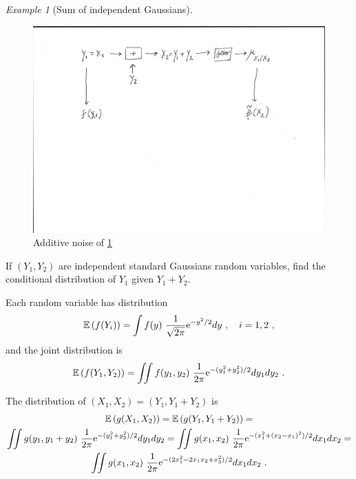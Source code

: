 \documentclass[12pt,a4paper]{amsart}
\theoremstyle{plain}%
\theoremstyle{definition}
\theoremstyle{remark}
\newtheorem{example}{Example}
\begin{document}
\begin{example}[Sum of independent Gaussians]\label{ex:filter}
\begin{figure}
  \centering
  \includegraphics[height=.2\textheight]{pictures/filter.pdf}
  \caption{Additive noise of \cref{ex:filter}\label{fig:filter}}
\end{figure}
If $(Y_1,Y_2)$ are independent standard Gaussians random variables,
find the conditional distribution of $Y_1$ given $Y_1+Y_2$.

Each random variable has distribution
\begin{equation*}
  \expectof{f(Y_i)} = \int f(y) \ \frac1{\sqrt{2\pi}}
  \euler^{-y^2/2}dy \ , \quad i=1,2 \ ,
\end{equation*}
and the joint distribution is
\begin{equation*}
  \operatorname{\mathbb E}\left(f(Y_1,Y_2)\right) = \iint f(y_1,y_2) \ \frac1{2\pi} 
  \mathrm{e}^{-(y_1^2+y_2^2)/2}dy_1dy_2 \ .
\end{equation*}

The distribution of $(X_1,X_2) = (Y_1,Y_1+Y_2)$ is
\begin{multline*}
  \expectof{g(X_1,X_2)} = \expectof{g(Y_1,Y_1+Y_2)} = \\ \iint g(y_1,y_1+y_2) \ \frac1{2\pi} 
  \euler^{-(y_1^2+y_2^2)/2}dy_1dy_2 = 
 \iint g(x_1,x_2) \ \frac1{2\pi} 
  \euler^{-(x_1^2+(x_2-x_1)^2)/2}dx_1dx_2 = \\  \iint g(x_1,x_2) \ \frac1{2\pi}
  \euler^{-(2x_1^2 -2x_1x_2 + x_2^2)/2}dx_1dx_2  \ . 
\end{multline*}


\end{example}
\end{document}

